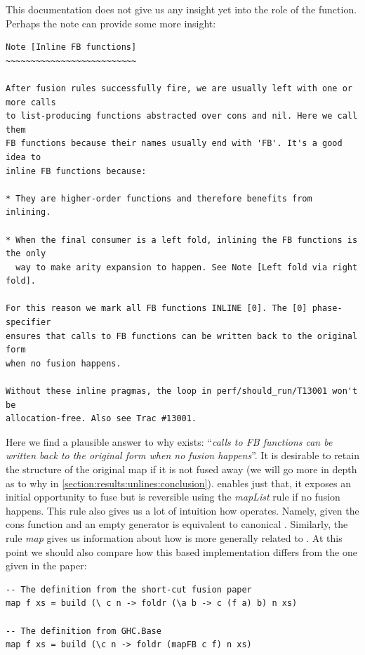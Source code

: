 This documentation does not give us any insight yet into the role of the  function. Perhaps the note  can provide
some more insight:

\begin{listing}[H]
\begin{verbatim}
Note [Inline FB functions]
~~~~~~~~~~~~~~~~~~~~~~~~~~

After fusion rules successfully fire, we are usually left with one or more calls
to list-producing functions abstracted over cons and nil. Here we call them
FB functions because their names usually end with 'FB'. It's a good idea to
inline FB functions because:

* They are higher-order functions and therefore benefits from inlining.

* When the final consumer is a left fold, inlining the FB functions is the only
  way to make arity expansion to happen. See Note [Left fold via right fold].

For this reason we mark all FB functions INLINE [0]. The [0] phase-specifier
ensures that calls to FB functions can be written back to the original form
when no fusion happens.

Without these inline pragmas, the loop in perf/should_run/T13001 won't be
allocation-free. Also see Trac #13001.
\end{verbatim}
\end{listing}

Here we find a plausible answer to why  exists: ``\textit{calls to FB functions can be written back to the original form
when no fusion happens}''. It is desirable to retain the structure of the original map if it is not fused away (we will go more in depth as to why in \cref{section:results:unlines:conclusion}).
 enables just that,
it exposes an initial opportunity to fuse but is reversible using the \textit{mapList} rule if no fusion happens. This rule also gives us a lot of
intuition how  operates. Namely, given the cons function and an empty generator is equivalent to canonical . 
Similarly, the rule \textit{map} gives us information about how  is more generally related to . At this point we should
also compare how this  based implementation differs from the one given in the paper:

\begin{listing}[H]
\begin{verbatim}
-- The definition from the short-cut fusion paper
map f xs = build (\ c n -> foldr (\a b -> c (f a) b) n xs)

-- The definition from GHC.Base
map f xs = build (\c n -> foldr (mapFB c f) n xs)
\end{verbatim}
\end{listing}

